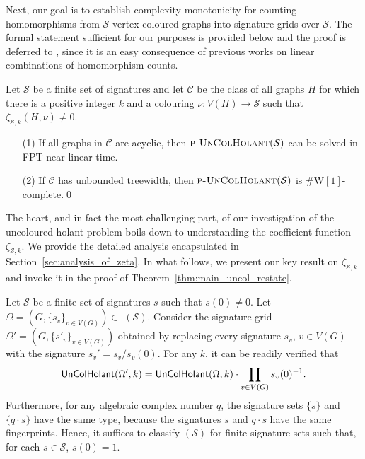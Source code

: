 \documentclass[authorcolumns,numberwithinsect]{no-lipics-v2022}
\newcommand{\W}{\mathrm{W}}
\begin{document}
Next, our goal is to establish complexity monotonicity for counting homomorphisms from $\mathcal{S}$-vertex-coloured graphs into signature grids over $\mathcal{S}$. The formal statement sufficient for our purposes is provided below and the proof is deferred to , since it is an easy consequence of previous works on linear combinations of homomorphism counts.

\begin{lemma}\label{lem:monotonicity_S-coloured}
    Let $\mathcal{S}$ be a finite set of signatures and let $\mathcal{C}$ be the class of all graphs $H$ for which there is a positive integer $k$ and a colouring $\nu:V(H)\to \mathcal{S}$ such that $\zeta_{\mathcal{S},k}(H,\nu)\neq 0$.
    \begin{itemize}
        \item[(1)] If all graphs in $\mathcal{C}$ are acyclic, then  $\text{\sc{p-UnColHolant}}(\mathcal{S})$ can be solved in FPT-near-linear time.
        \item[(2)] If $\mathcal{C}$ has unbounded treewidth, then $\text{\sc{p-UnColHolant}}(\mathcal{S})$ is $\#\W[1]$-complete.\qed
    \end{itemize}
\end{lemma}

The heart, and in fact the most challenging part, of our investigation of the uncoloured holant problem boils down to understanding the coefficient function $\zeta_{\mathcal{S},k}$. We provide the detailed analysis encapsulated in Section~\ref{sec:analysis_of_zeta}. In what follows, we present our key result on $\zeta_{\mathcal{S},k}$ and invoke it in the proof of Theorem~\ref{thm:main_uncol_restate}.

\begin{remark}[On $s(0)=1$]\label{rem:s_zero_equals_1}
Let $\mathcal{S}$ be a finite set of signatures $s$ such that $s(0) \neq 0$. Let $\Omega = (G, \{s_v\}_{v\in V(G)}) \in$ $(\mathcal{S})$. Consider the signature grid $\Omega' = (G, \{s'_v\}_{v \in V(G)})$ obtained by replacing every signature $s_v$, $v \in V(G)$ with the signature $s_v' = s_v/s_v(0)$. For any $k$, it can be readily verified that 
\[\textup{\textsf{UnColHolant}}(\Omega', k) = \textup{\textsf{UnColHolant}}(\Omega, k) \cdot \prod_{v \in V(G)}s_v(0)^{-1}.\] 
Furthermore, for any algebraic complex number $q$, the signature sets $\{s\}$ and $\{q\cdot s\}$ have the same type, because the signatures $s$ and $q\cdot s$ have the same fingerprints. Hence, it suffices to classify $(\mathcal{S})$ for finite signature sets such that, for each $s \in \mathcal{S}$, $s(0) = 1$.
\end{remark}
\end{document}
